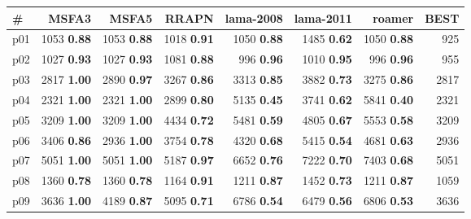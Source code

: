\begin{tabular}{|l|rrrrrr|r|}
\hline
\textbf{\#} & \textbf{MSFA3} & \textbf{MSFA5} & \textbf{RRAPN} & \textbf{lama-2008} & \textbf{lama-2011} & \textbf{roamer} & \textbf{BEST}\\
\hline
p01 & {\footnotesize 1053} \textbf{0.88} & {\footnotesize 1053} \textbf{0.88} & {\footnotesize 1018} \textbf{0.91} & {\footnotesize 1050} \textbf{0.88} & {\footnotesize 1485} \textbf{0.62} & {\footnotesize 1050} \textbf{0.88} & 925\\
p02 & {\footnotesize 1027} \textbf{0.93} & {\footnotesize 1027} \textbf{0.93} & {\footnotesize 1081} \textbf{0.88} & {\footnotesize 996} \textbf{0.96} & {\footnotesize 1010} \textbf{0.95} & {\footnotesize 996} \textbf{0.96} & 955\\
p03 & {\footnotesize 2817} \textbf{1.00} & {\footnotesize 2890} \textbf{0.97} & {\footnotesize 3267} \textbf{0.86} & {\footnotesize 3313} \textbf{0.85} & {\footnotesize 3882} \textbf{0.73} & {\footnotesize 3275} \textbf{0.86} & 2817\\
p04 & {\footnotesize 2321} \textbf{1.00} & {\footnotesize 2321} \textbf{1.00} & {\footnotesize 2899} \textbf{0.80} & {\footnotesize 5135} \textbf{0.45} & {\footnotesize 3741} \textbf{0.62} & {\footnotesize 5841} \textbf{0.40} & 2321\\
p05 & {\footnotesize 3209} \textbf{1.00} & {\footnotesize 3209} \textbf{1.00} & {\footnotesize 4434} \textbf{0.72} & {\footnotesize 5481} \textbf{0.59} & {\footnotesize 4805} \textbf{0.67} & {\footnotesize 5553} \textbf{0.58} & 3209\\
p06 & {\footnotesize 3406} \textbf{0.86} & {\footnotesize 2936} \textbf{1.00} & {\footnotesize 3754} \textbf{0.78} & {\footnotesize 4320} \textbf{0.68} & {\footnotesize 5415} \textbf{0.54} & {\footnotesize 4681} \textbf{0.63} & 2936\\
p07 & {\footnotesize 5051} \textbf{1.00} & {\footnotesize 5051} \textbf{1.00} & {\footnotesize 5187} \textbf{0.97} & {\footnotesize 6652} \textbf{0.76} & {\footnotesize 7222} \textbf{0.70} & {\footnotesize 7403} \textbf{0.68} & 5051\\
p08 & {\footnotesize 1360} \textbf{0.78} & {\footnotesize 1360} \textbf{0.78} & {\footnotesize 1164} \textbf{0.91} & {\footnotesize 1211} \textbf{0.87} & {\footnotesize 1452} \textbf{0.73} & {\footnotesize 1211} \textbf{0.87} & 1059\\
p09 & {\footnotesize 3636} \textbf{1.00} & {\footnotesize 4189} \textbf{0.87} & {\footnotesize 5095} \textbf{0.71} & {\footnotesize 6786} \textbf{0.54} & {\footnotesize 6479} \textbf{0.56} & {\footnotesize 6806} \textbf{0.53} & 3636\\

\end{tabular}
